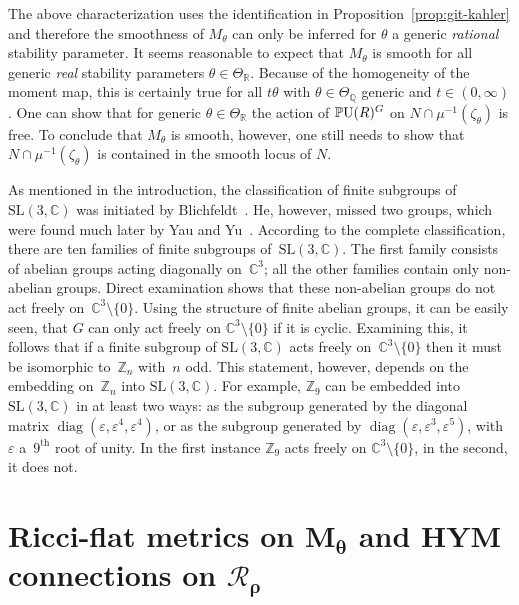 \documentclass[10pt,a4paper]{amsart}
\numberwithin{equation}{section}
\newcommand{\cR}{\mathcal{R}}
\newcommand{\Z}{{\mathbb Z}}
\newcommand{\Q}{{\mathbb Q}}
\newcommand{\R}{{\mathbb R}}
\newcommand{\C}{{\mathbb C}}
\newcommand{\SL}{\mathrm{SL}}
\newcommand{\PU}{{\mathbb P}{\rm U}}
\renewcommand{\epsilon}{\varepsilon}
\begin{document}
\begin{Remark}
  The above characterization uses the identif\/ication in
  Proposition~\ref{prop:git-kahler} and therefore the smoothness of
  $M_{\theta}$ can only be inferred for $\theta$ a generic {\em
    rational} stability parameter.  It seems reasonable to expect that
  $M_\theta$ is smooth for all generic \emph{real} stability
  parameters $\theta \in \Theta_\R$.  Because of the homogeneity of
  the moment map, this is certainly true for all $t\theta$ with
  $\theta \in \Theta_{\Q}$ generic and $t\in(0,\infty)$.  One can show
  that for generic $\theta\in\Theta_\R$ the action of $\PU(R)^G$ on
  $N \cap \mu^{-1}(\zeta_\theta)$ is free.  To conclude that
  $M_{\theta}$ is smooth, however, one still needs to show that
  $N\cap \mu^{-1}(\zeta_\theta)$ is contained in the smooth locus of
  $N$.
\end{Remark}

\begin{Remark}\label{rem:fg}
  As mentioned in the introduction, the classif\/ication of f\/inite subgroups of $\SL(3,\C)$ was initiated by  Blichfeldt~\cite{Blichfeldt1917}. He, however, missed two groups, which were found much later by Yau and Yu~\cite{Yau-Stephan1993}.  According to the complete classif\/ication, there are ten families of f\/inite subgroups of~$\SL(3,\C)$.  The f\/irst family consists of abelian groups acting diagonally on~$\C^3$; all the other families contain only non-abelian groups. Direct examination shows that these
non-abelian groups do not act freely on~$\C^3{\setminus} \{0\}$. Using the structure of f\/inite abelian groups, it can be easily seen, that
$G$ can only act freely on $\C^3{\setminus} \{0\}$ if it is cyclic. Examining this, it follows that if a f\/inite subgroup of
$\SL(3,\C)$ acts freely on~$\C^3{\setminus} \{0\}$ then it must be isomorphic to~$\Z_n$ with~$n$ odd.
This statement, however, depends on the embedding on~$\Z_n$ into $\SL(3, \C)$. For example, $\Z_9$ can be embedded into $\SL(3,\C)$ in at least two ways: as the subgroup generated by the diagonal matrix $\operatorname{diag}(\epsilon,\epsilon^4, \epsilon^4)$, or as the subgroup generated by $\operatorname{diag}(\epsilon, \epsilon^3, \epsilon^5)$, with~$\epsilon$ a~$9^{\text{th}}$ root of unity. In the f\/irst instance $\Z_9$ acts freely on $\C^3{\setminus} \{0\}$, in the second, it does not.
\end{Remark}

\section[Ricci-f\/lat metrics on $M_\theta$ and HYM connections on $\cR_{\rho}$]{Ricci-f\/lat metrics on $\boldsymbol{M_\theta}$ and HYM connections on $\boldsymbol{\cR_{\rho}}$}
\label{sec:RFHYM}
\end{document}
